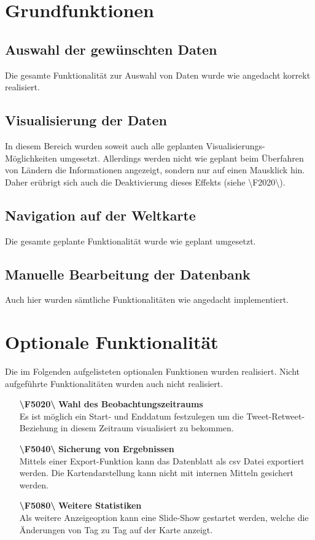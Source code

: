 \section{Grundfunktionen}

\subsection{Auswahl der gewünschten Daten}
Die gesamte Funktionalität zur Auswahl von Daten wurde wie angedacht korrekt realisiert.

\subsection{Visualisierung der Daten}
In diesem Bereich wurden soweit auch alle geplanten Visualisierungs-Möglichkeiten umgesetzt. Allerdings werden nicht wie geplant beim Überfahren von Ländern die Informationen angezeigt, sondern nur auf einen Mausklick hin. Daher erübrigt sich auch die Deaktivierung dieses Effekts (siehe \textbackslash F2020\textbackslash).

\subsection{Navigation auf der Weltkarte}
Die gesamte geplante Funktionalität wurde wie geplant umgesetzt.

\subsection{Manuelle Bearbeitung der Datenbank}
Auch hier wurden sämtliche Funktionalitäten wie angedacht implementiert.

\section{Optionale Funktionalität}
Die im Folgenden aufgelisteten optionalen Funktionen wurden realisiert. Nicht aufgeführte Funktionalitäten wurden auch nicht realisiert.
\begin{enumerate}[ align=left]
	\item[\textbf{\textbackslash F5020\textbackslash}] \textbf{Wahl des Beobachtungszeitraums} \label{PF:WahlZeitraum} \\
	Es ist möglich ein Start- und Enddatum festzulegen um die Tweet-Retweet-Beziehung in diesem Zeitraum visualisiert zu bekommen.
	\item[\textbf{\textbackslash F5040\textbackslash}]  \textbf{Sicherung von Ergebnissen} \label{PF:Sicherung} \\
	Mittels einer Export-Funktion kann das Datenblatt als csv Datei exportiert werden. Die Kartendarstellung kann nicht mit internen Mitteln gesichert werden.
	\item[\textbf{\textbackslash F5080\textbackslash}] \textbf{Weitere Statistiken} \label{PF:Statistiken} \\
	Als weitere Anzeigeoption kann eine Slide-Show gestartet werden, welche die Änderungen von Tag zu Tag auf der Karte anzeigt.
\end{enumerate}

